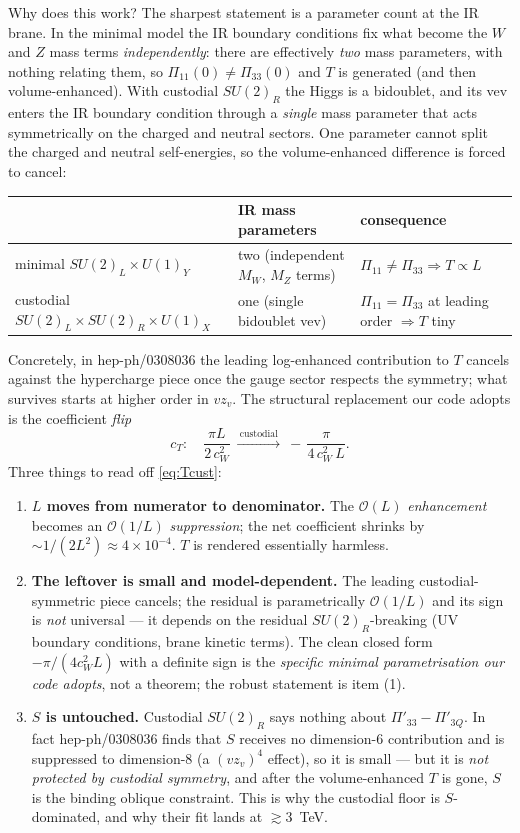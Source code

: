 \documentclass[11pt]{article}
\newcommand{\cwsq}{c_W^2}
\newcommand{\Pibig}{\Pi}
\newcommand{\vev}{v}
\newcommand{\SUL}{SU(2)_L}
\newcommand{\SUR}{SU(2)_R}
\newcommand{\UX}{U(1)_X}
\theoremstyle{definition}
\begin{document}
Why does this work? The sharpest statement is a parameter count at the IR brane.
In the minimal model the IR boundary conditions fix what become the $W$ and $Z$
mass terms \emph{independently}: there are effectively \emph{two} mass
parameters, with nothing relating them, so $\Pibig_{11}(0)\neq\Pibig_{33}(0)$ and
$T$ is generated (and then volume-enhanced). With custodial $\SUR$ the Higgs is a
bidoublet, and its vev enters the IR boundary condition through a \emph{single}
mass parameter that acts symmetrically on the charged and neutral sectors. One
parameter cannot split the charged and neutral self-energies, so the
volume-enhanced difference is forced to cancel:
\begin{center}
\begin{tabular}{lll}
\toprule
 & IR mass parameters & consequence \\
\midrule
minimal $\SUL\times U(1)_Y$ & two (independent $M_W$, $M_Z$ terms) & $\Pibig_{11}\neq\Pibig_{33}\Rightarrow T\propto L$ \\
custodial $\SUL\times\SUR\times\UX$ & one (single bidoublet vev) & $\Pibig_{11}=\Pibig_{33}$ at leading order $\Rightarrow T$ tiny \\
\bottomrule
\end{tabular}
\end{center}
Concretely, in hep-ph/0308036 the leading log-enhanced contribution to $T$
cancels against the hypercharge piece once the gauge sector respects the
symmetry; what survives starts at higher order in $\vev z_v$. The structural
replacement our code adopts is the coefficient \emph{flip}
\begin{equation}
\boxed{\;c_T:\quad \frac{\pi L}{2\,\cwsq}\ \xrightarrow{\ \text{custodial}\ }\
-\,\frac{\pi}{4\,\cwsq\,L}.\;}
\label{eq:Tcust}
\end{equation}
Three things to read off \eqref{eq:Tcust}:
\begin{enumerate}[leftmargin=1.6em]
\item \textbf{$L$ moves from numerator to denominator.} The $\mathcal{O}(L)$
\emph{enhancement} becomes an $\mathcal{O}(1/L)$ \emph{suppression}; the net
coefficient shrinks by $\sim 1/(2L^2)\approx 4\times10^{-4}$. $T$ is rendered
essentially harmless.
\item \textbf{The leftover is small and model-dependent.} The leading
custodial-symmetric piece cancels; the residual is parametrically
$\mathcal{O}(1/L)$ and its sign is \emph{not} universal --- it depends on the
residual $\SUR$-breaking (UV boundary conditions, brane kinetic terms). The clean
closed form $-\pi/(4\cwsq L)$ with a definite sign is the \emph{specific minimal
parametrisation our code adopts}, not a theorem; the robust statement is item (1).
\item \textbf{$S$ is untouched.} Custodial $\SUR$ says nothing about
$\Pibig'_{33}-\Pibig'_{3Q}$. In fact hep-ph/0308036 finds that $S$ receives no
dimension-6 contribution and is suppressed to dimension-8 (a $(\vev z_v)^4$
effect), so it is small --- but it is \emph{not protected by custodial symmetry},
and after the volume-enhanced $T$ is gone, $S$ is the binding oblique constraint.
This is why the custodial floor is $S$-dominated, and why their fit lands at
$\gtrsim 3$~TeV.
\end{enumerate}
\end{document}
